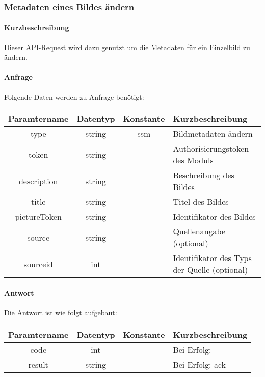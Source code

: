 \subsubsection{Metadaten eines Bildes ändern}
\paragraph{Kurzbeschreibung}Dieser API-Request wird dazu genutzt um die Metadaten für ein Einzelbild zu ändern.
\paragraph{Anfrage}Folgende Daten werden zu Anfrage benötigt:
\begin{table}[H]
	\begin{tabular}{|c|c|c|p{6.5cm}|}
		\hline
		\textbf{Paramtername} & \textbf{Datentyp} & \textbf{Konstante} & \textbf{Kurzbeschreibung}                                                                                               \\ \hline
		type                & string            & ssm                & Bildmetadaten ändern \\ \hline
		token               & string            &                    & Authorisierungstoken des Moduls \\ \hline
		description         & string            &                    & Beschreibung des Bildes \\ \hline
		title               & string            &                    & Titel des Bildes \\ \hline
		pictureToken        & string            &                    & Identifikator des Bildes \\ \hline
		source              & string            &                    & Quellenangabe (optional) \\ \hline
		sourceid            & int               &                    & Identifikator des Typs der Quelle (optional) \\ \hline
	\end{tabular}
\end{table}
\paragraph{Antwort}Die Antwort ist wie folgt aufgebaut:
\begin{table}[H]
	\begin{tabular}{|c|c|c|p{6.5cm}|}
		\hline
		\textbf{Paramtername} & \textbf{Datentyp} & \textbf{Konstante} & \textbf{Kurzbeschreibung}            \\ \hline                
		code                & int              &                 & Bei Erfolg: {\glqq 0\grqq} \\ \hline
		result              & string           &                 & Bei Erfolg: {\glqq ack\grqq} \\ \hline
	\end{tabular}
\end{table}

